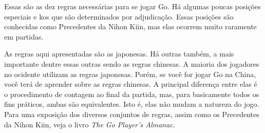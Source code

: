 Essas são as dez regras necessárias para se jogar Go. Há algumas poucas posições especiais e kos que são determinados por adjudicação. Essas posições são conhecidas como Precedentes da Nihon Kiin, mas elas ocorrem muito raramente em partidas.

As regras aqui apresentadas são as japonesas. Há outras também, a mais importante dentre essas outras sendo as regras chinesas. A maioria dos jogadores no ocidente utilizam as regras japonesas. Porém, se você for jogar Go na China, você terá de aprender sobre as regras chinesas. A principal diferença entre elas é o procedimento de contagem ao final da partida, mas, para basicamente todos os fins práticos, ambas são equivalentes. Isto é, elas não mudam a natureza do jogo. Para uma exposição dos diversos conjuntos de regras, assim como os Precedentes da Nihon Kiin, veja o livro \emph{The Go Player's Almanac}.